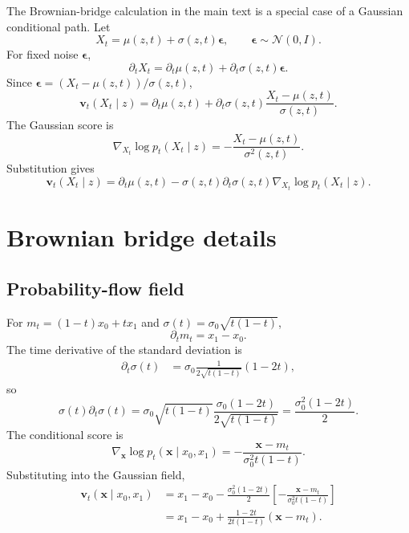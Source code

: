 \documentclass{article}
\newcommand{\vx}{\bm{x}}
\newcommand{\vv}{\bm{v}}
\newcommand{\veps}{\bm{\epsilon}}
\theoremstyle{plain}
\theoremstyle{definition}
\theoremstyle{remark}
\begin{document}
The Brownian-bridge calculation in the main text is a special case of a Gaussian conditional path. Let
\begin{equation}
  X_t=\mu(z,t)+\sigma(z,t)\veps,\qquad \veps\sim\mathcal{N}(0,I).
\end{equation}
For fixed noise $\veps$,
\begin{equation}
  \partial_t X_t=\partial_t\mu(z,t)+\partial_t\sigma(z,t)\veps.
\end{equation}
Since $\veps=(X_t-\mu(z,t))/\sigma(z,t)$,
\begin{equation}
  \vv_t(X_t\mid z)=\partial_t\mu(z,t)+\partial_t\sigma(z,t)\frac{X_t-\mu(z,t)}{\sigma(z,t)}.
\end{equation}
The Gaussian score is
\begin{equation}
  \nabla_{X_t}\log p_t(X_t\mid z)=-\frac{X_t-\mu(z,t)}{\sigma^2(z,t)}.
\end{equation}
Substitution gives
\begin{equation}
  \vv_t(X_t\mid z)
  =
  \partial_t\mu(z,t)
  -
  \sigma(z,t)\partial_t\sigma(z,t)
  \nabla_{X_t}\log p_t(X_t\mid z).
\end{equation}

\section{Brownian bridge details}
\label{app:bb_details}

\subsection{Probability-flow field}

For $m_t=(1-t)x_0+tx_1$ and $\sigma(t)=\sigma_0\sqrt{t(1-t)}$,
\begin{equation}
  \partial_t m_t=x_1-x_0.
\end{equation}
The time derivative of the standard deviation is
\begin{align}
  \partial_t\sigma(t)
  &=
  \sigma_0\frac{1}{2\sqrt{t(1-t)}}(1-2t),
\end{align}
so
\begin{equation}
  \sigma(t)\partial_t\sigma(t)
  =
  \sigma_0\sqrt{t(1-t)}
  \frac{\sigma_0(1-2t)}{2\sqrt{t(1-t)}}
  =
  \frac{\sigma_0^2(1-2t)}{2}.
\end{equation}
The conditional score is
\begin{equation}
  \nabla_{\vx}\log p_t(\vx\mid x_0,x_1)
  =
  -\frac{\vx-m_t}{\sigma_0^2t(1-t)}.
\end{equation}
Substituting into the Gaussian field,
\begin{align}
  \vv_t(\vx\mid x_0,x_1)
  &=
  x_1-x_0
  -
  \frac{\sigma_0^2(1-2t)}{2}
  \left[-\frac{\vx-m_t}{\sigma_0^2t(1-t)}\right] \\
  &=
  x_1-x_0
  +
  \frac{1-2t}{2t(1-t)}(\vx-m_t).
\end{align}
\end{document}
